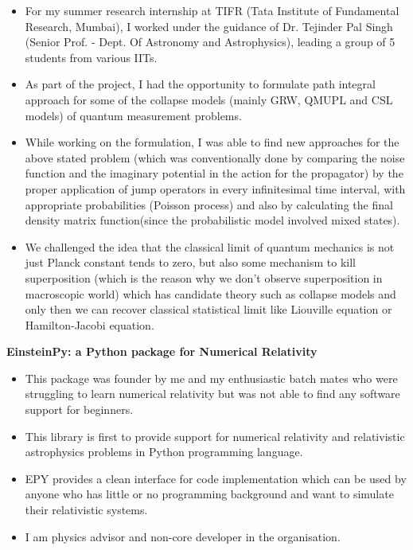 \documentclass[a4paper]{article}
\begin{document}
\begin{itemize}
    \item For my summer research internship at TIFR (Tata Institute of Fundamental Research, Mumbai), I worked under the guidance of Dr. Tejinder Pal Singh (Senior Prof. - Dept. Of Astronomy and Astrophysics), leading a group of 5 students from various IITs.
    \item As part of the project, I had the opportunity to formulate path integral approach for some of the collapse models (mainly GRW, QMUPL and CSL models) of quantum measurement problems.
    \item While working on the formulation, I was able to find new approaches for the above stated problem (which was conventionally done by comparing the noise function and the imaginary potential in the action for the propagator) by the proper application of jump operators in every infinitesimal time interval, with appropriate probabilities (Poisson process) and also by calculating the final density matrix function(since the probabilistic model involved mixed states).
    \item We challenged the idea that the classical limit of quantum mechanics is not just Planck constant tends to zero, but also some mechanism to kill superposition (which is the reason why we don’t observe superposition in macroscopic world) which has candidate theory such as collapse models and only then we can recover classical statistical limit like Liouville equation or Hamilton-Jacobi equation.
\end{itemize}
\vspace*{2mm}
\textbf{EinsteinPy: a Python package for Numerical Relativity} \\
\begin{itemize}
    \item This package was founder by me and my enthusiastic batch mates who were struggling to learn numerical relativity but was not able to find any software support for beginners.
    \item This library is first to provide support for numerical relativity and relativistic astrophysics problems in Python programming language.
    \item EPY provides a clean interface for code implementation which can be used by anyone who has little or no programming background and want to simulate their relativistic systems.
    \item I am physics advisor and non-core developer in the organisation.
\end{itemize}
\end{document}
